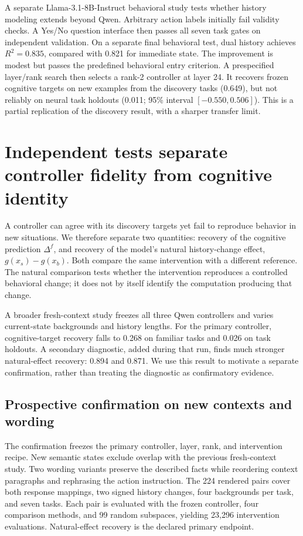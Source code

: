 \documentclass{article}
\begin{document}
A separate Llama-3.1-8B-Instruct behavioral study tests whether history modeling extends beyond Qwen. Arbitrary action labels initially fail validity checks. A Yes/No question interface then passes all seven task gates on independent validation. On a separate final behavioral test, dual history achieves $R^2=0.835$, compared with 0.821 for immediate state. The improvement is modest but passes the predefined behavioral entry criterion. A prespecified layer/rank search then selects a rank-2 controller at layer 24. It recovers frozen cognitive targets on new examples from the discovery tasks (0.649), but not reliably on neural task holdouts (0.011; 95\% interval $[-0.550,0.506]$). This is a partial replication of the discovery result, with a sharper transfer limit.

\section{Independent tests separate controller fidelity from cognitive identity}\label{sec:interpretation}
A controller can agree with its discovery targets yet fail to reproduce behavior in new situations. We therefore separate two quantities: recovery of the cognitive prediction $\Delta^f$, and recovery of the model's natural history-change effect, $g(x_s)-g(x_b)$. Both compare the same intervention with a different reference. The natural comparison tests whether the intervention reproduces a controlled behavioral change; it does not by itself identify the computation producing that change.

A broader fresh-context study freezes all three Qwen controllers and varies current-state backgrounds and history lengths. For the primary controller, cognitive-target recovery falls to 0.268 on familiar tasks and 0.026 on task holdouts. A secondary diagnostic, added during that run, finds much stronger natural-effect recovery: 0.894 and 0.871. We use this result to motivate a separate confirmation, rather than treating the diagnostic as confirmatory evidence.

\subsection{Prospective confirmation on new contexts and wording}
The confirmation freezes the primary controller, layer, rank, and intervention recipe. New semantic states exclude overlap with the previous fresh-context study. Two wording variants preserve the described facts while reordering context paragraphs and rephrasing the action instruction. The 224 rendered pairs cover both response mappings, two signed history changes, four backgrounds per task, and seven tasks. Each pair is evaluated with the frozen controller, four comparison methods, and 99 random subspaces, yielding 23,296 intervention evaluations. Natural-effect recovery is the declared primary endpoint.
\end{document}
